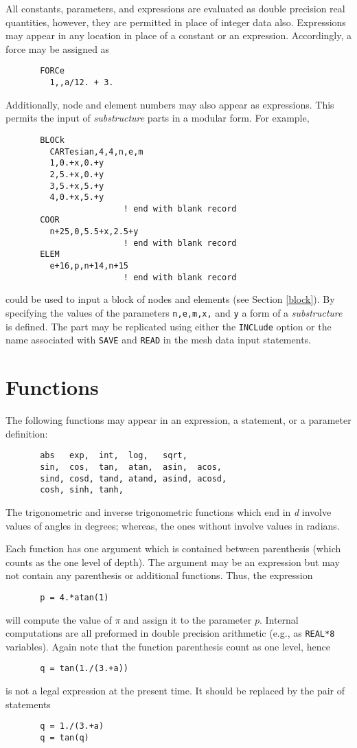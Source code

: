 All constants, parameters, and expressions are evaluated as double
precision real quantities, however, they are permitted in place of integer
data also.  Expressions may appear in any location
in place of a constant or an expression.  Accordingly, a force may
be assigned as
\begin{verbatim}
       FORCe
         1,,a/12. + 3.
\end{verbatim}
Additionally, node and element numbers may also
appear as expressions.  This permits the input of {\it substructure}
parts in a modular form.  For example,
\begin{verbatim}
       BLOCk
         CARTesian,4,4,n,e,m
         1,0.+x,0.+y
         2,5.+x,0.+y
         3,5.+x,5.+y
         4,0.+x,5.+y
                        ! end with blank record
       COOR
         n+25,0,5.5+x,2.5+y
                        ! end with blank record
       ELEM
         e+16,p,n+14,n+15
                        ! end with blank record
\end{verbatim}
could be used to input a block of nodes and elements (see Section \ref{block}).
By specifying
the values of the parameters {\tt n,e,m,x,} and {\tt y} a form of a
{\it substructure} is defined.  The part may be replicated using either
the {\tt INCLude} option or the
name associated with {\tt SAVE} and {\tt READ} in the mesh
data input statements.

\section{Functions}

The following functions may appear in an expression, a statement, or a
parameter definition:
\begin{verbatim}
       abs   exp,  int,  log,   sqrt,
       sin,  cos,  tan,  atan,  asin,  acos,
       sind, cosd, tand, atand, asind, acosd,
       cosh, sinh, tanh,
\end{verbatim}
The trigonometric and inverse trigonometric functions which end in {\it d}
involve values of angles in degrees; whereas, the ones without involve values
in radians.

Each function has one argument which is contained between parenthesis
(which counts as the one level of depth).  The argument may be an
expression but may not contain any parenthesis or additional functions.
Thus, the expression
\begin{verbatim}
       p = 4.*atan(1)
\end{verbatim}
will compute the value of $\pi$ and assign it to the parameter $p$.
Internal computations are all preformed in double precision arithmetic (e.g.,
as {\tt REAL*8} variables).
Again note that the function parenthesis count as one level, hence
\begin{verbatim}
       q = tan(1./(3.+a))
\end{verbatim}
is not a legal expression at the present time.
It should be replaced by the pair of statements
\begin{verbatim}
       q = 1./(3.+a)
       q = tan(q)
\end{verbatim}

